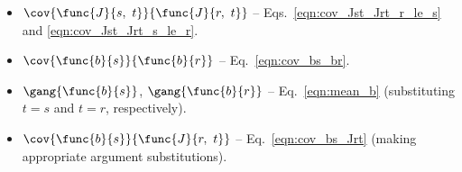 \begin{itemize}
	\item [] $\cov{\func{J}{s,\ t}}{\func{J}{r,\ t}}$ -- Eqs.~\ref{eqn:cov_Jst_Jrt_r_le_s} and \ref{eqn:cov_Jst_Jrt_s_le_r}.
	\item [] $\cov{\func{b}{s}}{\func{b}{r}}$ -- Eq.~\ref{eqn:cov_bs_br}.
	\item [] $\gang{\func{b}{s}}$, $\gang{\func{b}{r}}$ -- Eq.~\ref{eqn:mean_b} (substituting $t = s$ and $t = r$, respectively).
	\item [] $\cov{\func{b}{s}}{\func{J}{r,\ t}}$ -- Eq.~\ref{eqn:cov_bs_Jrt} (making appropriate argument substitutions).
\end{itemize}

